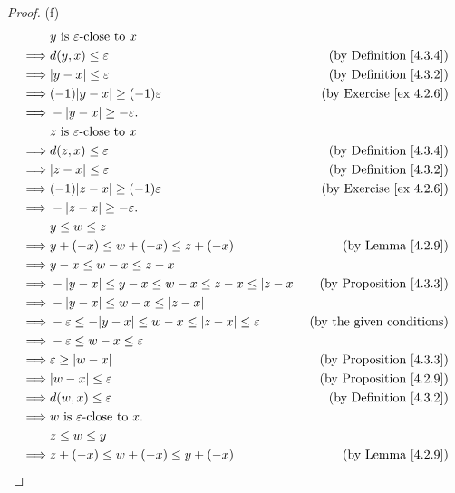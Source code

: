 \begin{proof}{(f)}
\begin{align*}
& y \text{ is } \varepsilon\text{-close to } x \\
\implies & d(y, x) \leq \varepsilon & \text{(by Definition \ref{4.3.4})} \\
\implies & \abs*{y - x} \leq \varepsilon & \text{(by Definition \ref{4.3.2})} \\
\implies & (-1)\abs*{y - x} \geq (-1)\varepsilon & \text{(by Exercise \ref{ex 4.2.6})} \\
\implies & -\abs*{y - x} \geq -\varepsilon. \\
& z \text{ is } \varepsilon\text{-close to } x \\
\implies & d(z, x) \leq \varepsilon & \text{(by Definition \ref{4.3.4})} \\
\implies & \abs*{z - x} \leq \varepsilon & \text{(by Definition \ref{4.3.2})} \\
\implies & (-1)\abs*{z - x} \geq (-1)\varepsilon & \text{(by Exercise \ref{ex 4.2.6})} \\
\implies & -\abs*{z - x} \geq -\varepsilon. \\
& y \leq w \leq z \\
\implies & y + (-x) \leq w + (-x) \leq z + (-x) & \text{(by Lemma \ref{4.2.9})} \\
\implies & y - x \leq w - x \leq z - x \\
\implies & -\abs*{y - x} \leq y - x \leq w - x \leq z - x \leq \abs*{z - x} & \text{(by Proposition \ref{4.3.3})} \\
\implies & -\abs*{y - x} \leq w - x \leq \abs*{z - x} \\
\implies & -\varepsilon \leq -\abs*{y - x} \leq w - x \leq \abs*{z - x} \leq \varepsilon & \text{(by the given conditions)} \\
\implies & -\varepsilon \leq w - x \leq \varepsilon \\
\implies & \varepsilon \geq \abs*{w - x} & \text{(by Proposition \ref{4.3.3})} \\
\implies & \abs*{w - x} \leq \varepsilon & \text{(by Proposition \ref{4.2.9})} \\
\implies & d(w, x) \leq \varepsilon & \text{(by Definition \ref{4.3.2})} \\
\implies & w \text{ is } \varepsilon\text{-close to } x. \\
& z \leq w \leq y \\
\implies & z + (-x) \leq w + (-x) \leq y + (-x) & \text{(by Lemma \ref{4.2.9})} \\

\end{align*}
\end{proof}
